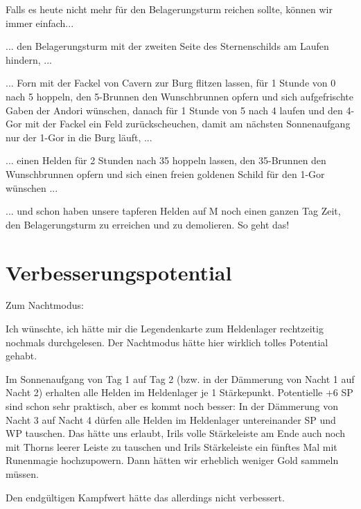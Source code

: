 \documentclass[10pt, a4paper, oneside]{book}
\begin{document}
{Falls es heute nicht mehr für den Belagerungsturm reichen sollte, können wir immer einfach...

... den Belagerungsturm mit der zweiten Seite des Sternenschilds am Laufen hindern, ...

... Forn mit der Fackel von Cavern zur Burg flitzen lassen, für 1 Stunde von 0 nach 5 hoppeln, den 5-Brunnen den Wunschbrunnen opfern und sich aufgefrischte Gaben der Andori wünschen, danach für 1 Stunde von 5 nach 4 laufen und den 4-Gor mit der Fackel ein Feld zurückscheuchen, damit am nächsten Sonnenaufgang nur der 1-Gor in die Burg läuft, ...

... einen Helden für 2 Stunden nach 35 hoppeln lassen, den 35-Brunnen den Wunschbrunnen opfern und sich einen freien goldenen Schild für den 1-Gor wünschen ...

... und schon haben unsere tapferen Helden auf M noch einen ganzen Tag Zeit, den Belagerungsturm zu erreichen und zu demolieren. So geht das!






\newpage
\section{Verbesserungspotential}







Zum Nachtmodus:



Ich wünschte, ich hätte mir die Legendenkarte zum Heldenlager rechtzeitig nochmals durchgelesen. Der Nachtmodus hätte hier wirklich tolles Potential gehabt.

Im Sonnenaufgang von Tag 1 auf Tag 2 (bzw. in der Dämmerung von Nacht 1 auf Nacht 2) erhalten alle Helden im Heldenlager je 1 Stärkepunkt. Potentielle +6 SP sind schon sehr praktisch, aber es kommt noch besser: In der Dämmerung von Nacht 3 auf Nacht 4 dürfen alle Helden im Heldenlager untereinander SP und WP tauschen. Das hätte uns erlaubt, Irils volle Stärkeleiste am Ende auch noch mit Thorns leerer Leiste zu tauschen und Irils Stärkeleiste ein fünftes Mal mit Runenmagie hochzupowern. Dann hätten wir erheblich weniger Gold sammeln müssen.

Den endgültigen Kampfwert hätte das allerdings nicht verbessert.\bigskip







}
\end{document}

